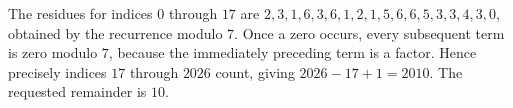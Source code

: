The residues for indices $0$ through $17$ are $2,3,1,6,3,6,1,2,1,5,6,6,5,3,3,4,3,0$, obtained by the recurrence modulo $7$. Once a zero occurs, every subsequent term is zero modulo $7$, because the immediately preceding term is a factor. Hence precisely indices $17$ through $2026$ count, giving $2026-17+1=2010$. The requested remainder is $\boxed{10}$.
